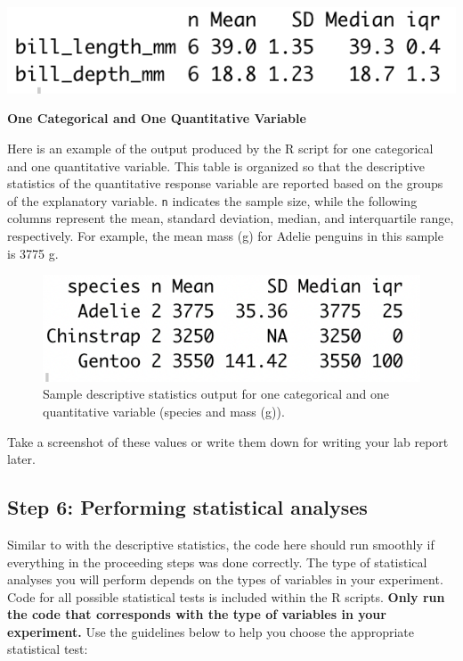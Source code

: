 \documentclass[
]{book}
\begin{document}
\includegraphics{images/quantitative_quantitative_stats_example.png}

\textbf{One Categorical and One Quantitative Variable}

Here is an example of the output produced by the R script for one categorical and one quantitative variable. This table is organized so that the descriptive statistics of the quantitative response variable are reported based on the groups of the explanatory variable. \texttt{n} indicates the sample size, while the following columns represent the mean, standard deviation, median, and interquartile range, respectively. For example, the mean mass (g) for Adelie penguins in this sample is 3775 g.

\begin{figure}
\centering
\includegraphics{images/quantitative-categorical_stats_example.png}
\caption{Sample descriptive statistics output for one categorical and one quantitative variable (species and mass (g)).}
\end{figure}

Take a screenshot of these values or write them down for writing your lab report later.

\hypertarget{step-6-performing-statistical-analyses}{%
\subsection*{Step 6: Performing statistical analyses}\label{step-6-performing-statistical-analyses}}

Similar to with the descriptive statistics, the code here should run smoothly if everything in the proceeding steps was done correctly. The type of statistical analyses you will perform depends on the types of variables in your experiment. Code for all possible statistical tests is included within the R scripts. \textbf{Only run the code that corresponds with the type of variables in your experiment.} Use the guidelines below to help you choose the appropriate statistical test:
\end{document}
